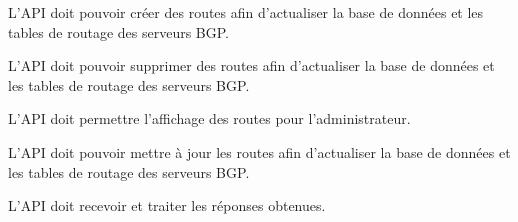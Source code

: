 L'API doit pouvoir créer des routes afin d'actualiser la base de données et les tables de routage des serveurs BGP.\bigskip

L'API doit pouvoir supprimer des routes afin d'actualiser la base de données et les tables de routage des serveurs BGP.\bigskip

L'API doit permettre l'affichage des routes pour l'administrateur.\bigskip

L'API doit pouvoir mettre à jour les routes afin d'actualiser la base de données et les tables de routage des serveurs BGP.\bigskip

L'API doit recevoir et traiter les réponses obtenues.\bigskip
